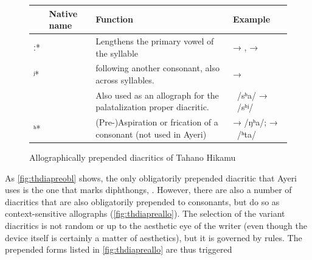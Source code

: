 \begin{figure}[htp]
\caption{Allographically prepended diacritics of Tahano Hikamu}
\begin{tabu} to 
\toprule
\tableheaderfont

	& Native name
	& Function
	& Example
	\\
	
\toprule

ː*
	& 
	& Lengthens the primary vowel of the syllable
	&  → ,\newline
		 → 
	\\
	
\midrule

ʲ*
	& 
	&  following another consonant, also across syllables.
	&  → 
	\\
	
	
	& 
	& Also used as an allograph for the palatalization proper diacritic.
	& ~/sʰa/ → ~/sʰʲ/
	\\
	
\midrule

ʰ*
	& 
	& (Pre-)Aspiration or frication of a consonant (not used in Ayeri)
	&  →  /ŋʰa/;\newline
		 → ~/ʰta/
	\\

\bottomrule
\end{tabu}
\label{fig:thdiapreallo}
\end{figure}

As \autoref{fig:thdiapreobl} shows, the only obligatorily prepended diacritic 
that Ayeri uses is the one that marks diphthongs, . 
However, there are also a number of diacritics that are also obligatorily 
prepended to consonants, but do so as context-sensitive allographs 
(\autoref{fig:thdiapreallo}). The selection of the variant diacritics is not 
random or up to the aesthetic eye of the writer (even though the device itself 
is certainly a matter of aesthetics), but it is governed by rules. The 
prepended forms listed in \autoref{fig:thdiapreallo} are thus triggered 

